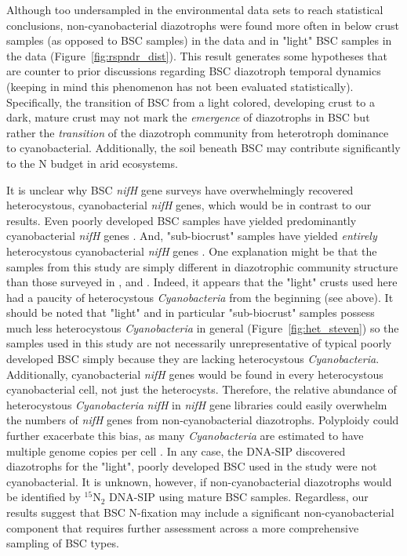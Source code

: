 Although too undersampled in the environmental data sets to reach statistical
conclusions, non-cyanobacterial diazotrophs were found more often in below
crust samples (as opposed to BSC samples) in the \citet{Steven_2013} data and
in "light" BSC samples in the \citet{Garcia_Pichel_2013} data
(Figure~\ref{fig:rspndr_dist}). This result generates some hypotheses that
are counter to prior discussions regarding BSC diazotroph temporal dynamics
(keeping in mind this phenomenon has not been evaluated statistically).
Specifically, the transition of BSC from a light colored, developing crust to
a dark, mature crust may not mark the \textit{emergence} of diazotrophs in
BSC but rather the \textit{transition} of the diazotroph community from
heterotroph dominance to cyanobacterial.  Additionally, the soil beneath BSC
may contribute significantly to the N budget in arid ecosystems.

It is unclear why BSC \textit{nifH} gene surveys have overwhelmingly
recovered heterocystous, cyanobacterial \textit{nifH} genes, which would be
in contrast to our results. Even poorly developed BSC samples have yielded
predominantly cyanobacterial \textit{nifH} genes \citep{14766579}. And,
"sub-biocrust" samples have yielded \textit{entirely} heterocystous
cyanobacterial \textit{nifH} genes \citep{Yeager_2012}. One explanation might
be that the samples from this study are simply different in diazotrophic
community structure than those surveyed in \citet{Yeager}, \citet{14766579}
and \citet{Yeager_2012}.  Indeed, it appears that the "light" crusts used
here had a paucity of heterocystous \textit{Cyanobacteria} from the beginning
(see above). It should be noted that "light" and in particular "sub-biocrust"
samples possess much less heterocystous \textit{Cyanobacteria} in general
(Figure~\ref{fig:het_steven}) so the samples used in this study are not
necessarily unrepresentative of typical poorly developed BSC simply because
they are lacking heterocystous \textit{Cyanobacteria}. Additionally, cyanobacterial
\textit{nifH} genes would be found in every heterocystous cyanobacterial
cell, not just the heterocysts.  Therefore, the relative abundance of
heterocystous \textit{Cyanobacteria} \textit{nifH} in \textit{nifH} gene
libraries could easily overwhelm the numbers of \textit{nifH} genes from
non-cyanobacterial diazotrophs. Polyploidy could further exacerbate this bias,
as many \textit{Cyanobacteria} are estimated to have multiple genome copies
per cell \citep{Griese_2011}. In any case, the DNA-SIP discovered diazotrophs
for the "light", poorly developed BSC used in the study were not
cyanobacterial. It is unknown, however, if non-cyanobacterial diazotrophs
would be identified by $^{15}$N$_{2}$ DNA-SIP using mature BSC samples.
Regardless, our results suggest that BSC N-fixation may include a significant
non-cyanobacterial component that requires further assessment across a more
comprehensive sampling of BSC types.

